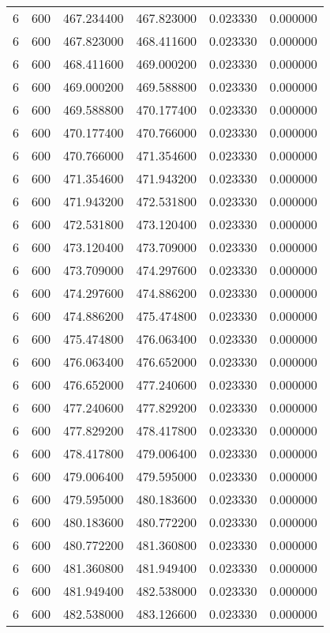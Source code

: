 \begin{longtable}{rrrrrr}
6 & 600 & 467.234400 & 467.823000 & 0.023330 & 0.000000 \\
6 & 600 & 467.823000 & 468.411600 & 0.023330 & 0.000000 \\
6 & 600 & 468.411600 & 469.000200 & 0.023330 & 0.000000 \\
6 & 600 & 469.000200 & 469.588800 & 0.023330 & 0.000000 \\
6 & 600 & 469.588800 & 470.177400 & 0.023330 & 0.000000 \\
6 & 600 & 470.177400 & 470.766000 & 0.023330 & 0.000000 \\
6 & 600 & 470.766000 & 471.354600 & 0.023330 & 0.000000 \\
6 & 600 & 471.354600 & 471.943200 & 0.023330 & 0.000000 \\
6 & 600 & 471.943200 & 472.531800 & 0.023330 & 0.000000 \\
6 & 600 & 472.531800 & 473.120400 & 0.023330 & 0.000000 \\
6 & 600 & 473.120400 & 473.709000 & 0.023330 & 0.000000 \\
6 & 600 & 473.709000 & 474.297600 & 0.023330 & 0.000000 \\
6 & 600 & 474.297600 & 474.886200 & 0.023330 & 0.000000 \\
6 & 600 & 474.886200 & 475.474800 & 0.023330 & 0.000000 \\
6 & 600 & 475.474800 & 476.063400 & 0.023330 & 0.000000 \\
6 & 600 & 476.063400 & 476.652000 & 0.023330 & 0.000000 \\
6 & 600 & 476.652000 & 477.240600 & 0.023330 & 0.000000 \\
6 & 600 & 477.240600 & 477.829200 & 0.023330 & 0.000000 \\
6 & 600 & 477.829200 & 478.417800 & 0.023330 & 0.000000 \\
6 & 600 & 478.417800 & 479.006400 & 0.023330 & 0.000000 \\
6 & 600 & 479.006400 & 479.595000 & 0.023330 & 0.000000 \\
6 & 600 & 479.595000 & 480.183600 & 0.023330 & 0.000000 \\
6 & 600 & 480.183600 & 480.772200 & 0.023330 & 0.000000 \\
6 & 600 & 480.772200 & 481.360800 & 0.023330 & 0.000000 \\
6 & 600 & 481.360800 & 481.949400 & 0.023330 & 0.000000 \\
6 & 600 & 481.949400 & 482.538000 & 0.023330 & 0.000000 \\
6 & 600 & 482.538000 & 483.126600 & 0.023330 & 0.000000 \\

\end{longtable}
